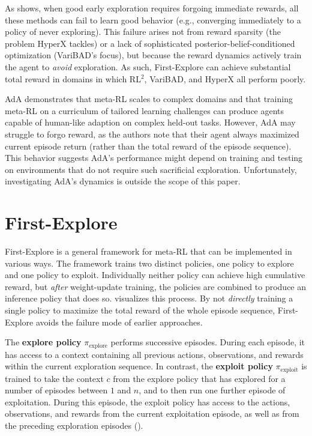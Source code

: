 \documentclass{article}
\begin{document}
As  shows, when good early exploration requires forgoing immediate rewards, all these methods can fail to learn good behavior (e.g., converging immediately to a policy of never exploring). This failure arises not from reward sparsity (the problem HyperX tackles) or a lack of sophisticated posterior-belief-conditioned optimization (VariBAD's focus), but because the reward dynamics actively train the agent to \emph{avoid} exploration. As such, First-Explore can achieve substantial total reward in domains in which RL\(^2\), VariBAD, and HyperX all perform poorly.

AdA \citep{adaptiveagentteam2023humantimescale} demonstrates that meta-RL scales to complex domains and that training meta-RL on a curriculum of tailored learning challenges can produce agents capable of human-like adaption on complex held-out tasks. However, AdA may struggle to forgo reward, as the authors note that their agent always maximized current episode return (rather than the total reward of the episode sequence). This behavior suggests AdA's performance might depend on training and testing on environments that do not require such sacrificial exploration. Unfortunately, investigating AdA's dynamics is outside the scope of this paper.%

\section{First-Explore}
\label{sec:overview}

\FloatBarrier

First-Explore is a general framework for meta-RL that can be implemented in various ways. The framework trains two distinct policies, one policy to explore and one policy to exploit. Individually neither policy can achieve high cumulative reward, but \emph{after} weight-update training, the policies are combined to produce an inference policy that does so.  visualizes this process. By not \emph{directly} training a single policy to maximize the total reward of the whole episode sequence, First-Explore avoids the failure mode of earlier approaches.

The \textbf{explore policy} \(\pi_{\text{explore}}\) performs successive episodes. During each episode, it has access to a context containing all previous actions, observations, and rewards within the current exploration sequence. In contrast, the \textbf{exploit policy} \(\pi_{\text{exploit}}\) is trained to take the context \(c\) from the explore policy that has explored for a number of episodes between \(1\) and  \(n\), and to then run one further episode of exploitation. During this episode, the exploit policy has access to the actions, observations, and rewards from the current exploitation episode, as well as from the preceding exploration episodes ().
\end{document}
